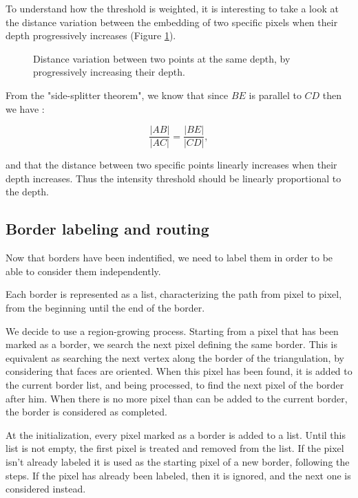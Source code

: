 \documentclass[11pt,fleqn]{book} %
\begin{document}
To understand how the threshold is weighted, it is interesting to take a look at the distance variation between the embedding of two specific pixels when their depth progressively increases (Figure \ref{fig:distance_depth_variation}).

\begin{figure}[ht]
  \centering
  \def\svgwidth{200pt}
  
  \caption{Distance variation between two points at the same depth, by progressively increasing their depth.}
  \label{fig:distance_depth_variation}
\end{figure}

From the "side-splitter theorem", we know that since $BE$ is parallel to $CD$ then we have :

\begin{equation}
	\frac{|AB|}{|AC|} = \frac{|BE|}{|CD|},
\end{equation}

and that the distance between two specific points linearly increases when their depth increases. Thus the intensity threshold should be linearly proportional to the depth.

\subsection{Border labeling and routing}
Now that borders have been indentified, we need to label them in order to be able to consider them independently. 

Each border is represented as a list, characterizing the path from pixel to pixel, from the beginning until the end of the border.

We decide to use a region-growing process. 
Starting from a pixel that has been marked as a border, we search the next pixel defining the same border. 
This is equivalent as searching the next vertex along the border of the triangulation, by considering that faces are oriented.
When this pixel has been found, it is added to the current border list, and being processed, to find the next pixel of the border after him.
When there is no more pixel than can be added to the current border, the border is considered as completed.

At the initialization, every pixel marked as a border is added to a list. Until this list is not empty, the first pixel is treated and removed from the list. 
If the pixel isn't already labeled it is used as the starting pixel of a new border, following the steps.
If the pixel has already been labeled, then it is ignored, and the next one is considered instead. 
\end{document}
